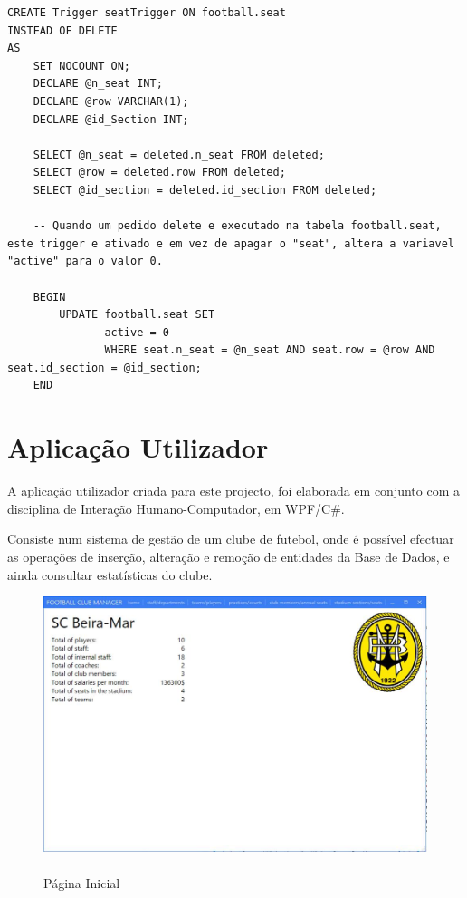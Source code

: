 \documentclass[pdftex,12pt,a4paper]{report}
\begin{document}
\begin{lstlisting}
CREATE Trigger seatTrigger ON football.seat
INSTEAD OF DELETE
AS
	SET NOCOUNT ON;
	DECLARE @n_seat INT;
	DECLARE @row VARCHAR(1);
	DECLARE @id_Section INT;

	SELECT @n_seat = deleted.n_seat FROM deleted;
	SELECT @row = deleted.row FROM deleted;
	SELECT @id_section = deleted.id_section FROM deleted;
	
	-- Quando um pedido delete e executado na tabela football.seat, este trigger e ativado e em vez de apagar o "seat", altera a variavel "active" para o valor 0.
	
	BEGIN
		UPDATE football.seat SET
			   active = 0
			   WHERE seat.n_seat = @n_seat AND seat.row = @row AND seat.id_section = @id_section;
	END
\end{lstlisting}
 \vspace{0,5in}

\newpage
\section{Aplicação Utilizador}
A aplicação utilizador criada para este projecto, foi elaborada em conjunto com a disciplina de Interação Humano-Computador, em WPF/C\#.

Consiste num sistema de gestão de um clube de futebol, onde é possível efectuar as operações de inserção, alteração e remoção de entidades da Base de Dados, e ainda consultar estatísticas do clube.
\\

\begin{figure}[!htb]
 \includegraphics[width=135mm,scale=1]{app_home_page.jpg}
 \caption{\\Página Inicial}\label{fig:eer}
\end{figure}
\end{document}
